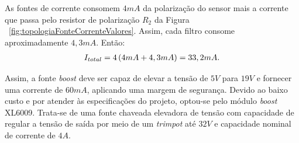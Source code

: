 \documentclass[
	12pt,				%
	openright,			%
	twoside,			%
	a4paper,			%
	english,			%
	french,				%
	spanish,			%
	brazil,				%
	]{abntex2}
\begin{document}
\begin{apendicesenv}
	As fontes de corrente consomem $4mA$ da polarização do sensor
	mais a corrente que passa pelo resistor de polarização $R_2$ da Figura ~\ref{fig:topologiaFonteCorrenteValores}.
	Assim, cada filtro consome aproximadamente $4,3mA$. Então:
	\begin{gather*}
		I_{total} = 4\* \left(4mA + 4,3mA\right) = 33,2mA.
	\end{gather*}

	Assim, a fonte \textit{boost} deve ser capaz de elevar a tensão
	de $5V$ para $19V$ e fornecer uma corrente de $60mA$, aplicando uma
	margem de segurança. Devido ao baixo custo e por atender às
	especificações do projeto, optou-se pelo módulo \textit{boost}
	XL6009. Trata-se de uma fonte chaveada elevadora de tensão com
	capacidade de regular a tensão de saída por meio de um
	\textit{trimpot} até $32V$ e capacidade nominal de corrente de $4A$.

\end{apendicesenv}







\end{document}
